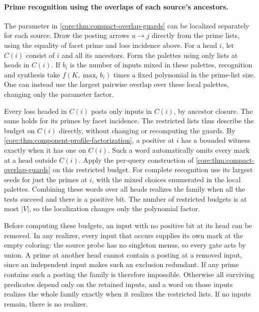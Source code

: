 \paragraph{Prime recognition using the overlaps of each source's ancestors.}
The parameter in \cref{core:thm:compact-overlap-guards} can be
localized separately for each source. Draw the posting arrows
$u\to j$ directly from the prime lists, using the equality of
facet prime and loss incidence above. For a head $i$, let $C(i)$
consist of $i$ and all its ancestors. Form the palettes using
only lists at heads in $C(i)$. If $b_i$ is the number of inputs
mixed in these palettes, recognition and synthesis take
$f(K,\max_i b_i)$ times a fixed polynomial in the prime-list size.
One can instead use the largest pairwise overlap over these
local palettes, changing only the parameter factor.

Every loss headed in $C(i)$ posts only inputs in $C(i)$, by
ancestor closure. The same holds for its primes by facet
incidence. The restricted lists thus describe the budget on
$C(i)$ directly, without changing or recomputing the guards.
By \cref{core:thm:component-profile-factorization}, a positive
at $i$ has a bounded witness exactly when it has one on
$C(i)$. Such a word automatically omits every mark at a head
outside $C(i)$. Apply the per-query construction of
\cref{core:thm:compact-overlap-guards} on this restricted budget.
For complete recognition use its largest seeds for just the
primes at $i$, with the mixed choices enumerated in the local
palettes. Combining these words over all heads realizes the
family when all the tests succeed and there is a positive bit.
The number of restricted budgets is at most $|V|$, so the
localization changes only the polynomial factor.

Before computing these budgets, an input with no positive bit at
its head can be removed. In any realizer, every input that occurs
supplies its own mark at the empty coloring: the source probe has
no singleton menus, so every gate acts by union. A prime at another
head cannot contain a posting at a removed input, since an
independent input makes such an exclusion redundant. If any prime
contains such a posting the family is therefore impossible.
Otherwise all surviving predicates depend only on the retained
inputs, and a word on those inputs realizes the whole family
exactly when it realizes the restricted lists. If no inputs remain,
there is no realizer.
